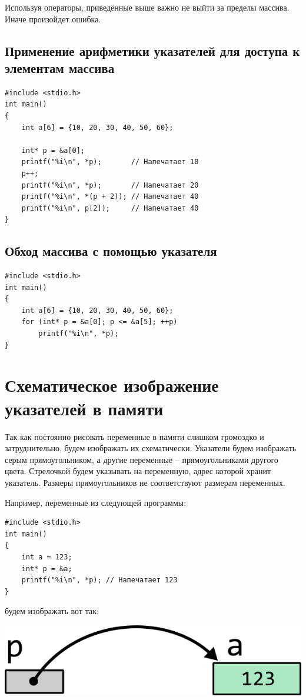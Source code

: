 \documentclass{article}
\begin{document}
Используя операторы, приведённые выше важно не выйти за пределы массива. Иначе произойдет ошибка. 

\subsection*{Применение арифметики указателей для доступа к элементам массива}
\begin{lstlisting}
#include <stdio.h>
int main() 
{
    int a[6] = {10, 20, 30, 40, 50, 60};
    
    int* p = &a[0];
    printf("%i\n", *p);       // Напечатает 10
    p++;
    printf("%i\n", *p);       // Напечатает 20
    printf("%i\n", *(p + 2)); // Напечатает 40
    printf("%i\n", p[2]);     // Напечатает 40
}
\end{lstlisting}


\subsection*{Обход массива с помощью указателя}
\begin{lstlisting}
#include <stdio.h>
int main() 
{
    int a[6] = {10, 20, 30, 40, 50, 60};
    for (int* p = &a[0]; p <= &a[5]; ++p) 
        printf("%i\n", *p);
}
\end{lstlisting}



\newpage

\section*{Схематическое изображение указателей в памяти}
Так как постоянно рисовать переменные в памяти слишком громоздко и затруднительно, будем изображать их схематически. Указатели будем изображать серым прямоугольником, а другие переменные -- прямоугольниками другого цвета. Стрелочкой будем указывать на переменную, адрес которой хранит указатель. Размеры прямоугольников не соответствуют размерам переменных.

Например, переменные из следующей программы:

\begin{lstlisting}
#include <stdio.h>
int main() 
{
    int a = 123;
    int* p = &a;
    printf("%i\n", *p); // Напечатает 123
}
\end{lstlisting}

будем изображать вот так:

\begin{center}
\includegraphics[scale=1]{../images/memory_3_pointer_to_int_b_scheme.png}
\end{center}
\end{document}
